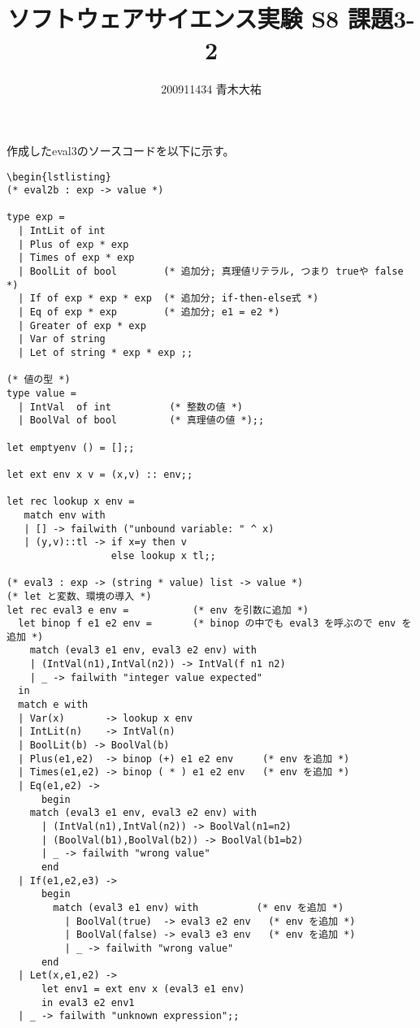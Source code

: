 \documentclass[a4paper,9pt]{jarticle}
\title{ソフトウェアサイエンス実験 S8 課題3-2}
\author{200911434 青木大祐}
\begin{document}
\maketitle
\setcounter{section}{3}
\setcounter{subsection}{1}

\newpage
作成したeval3のソースコードを以下に示す。
\begin{lstlisting}
\begin{lstlisting}
(* eval2b : exp -> value *)

type exp =
  | IntLit of int
  | Plus of exp * exp 
  | Times of exp * exp
  | BoolLit of bool        (* 追加分; 真理値リテラル, つまり trueや false  *)
  | If of exp * exp * exp  (* 追加分; if-then-else式 *)
  | Eq of exp * exp        (* 追加分; e1 = e2 *)
  | Greater of exp * exp 
  | Var of string        
  | Let of string * exp * exp ;;

(* 値の型 *)
type value =
  | IntVal  of int          (* 整数の値 *)
  | BoolVal of bool         (* 真理値の値 *);;
 
let emptyenv () = [];;

let ext env x v = (x,v) :: env;;

let rec lookup x env =
   match env with
   | [] -> failwith ("unbound variable: " ^ x)
   | (y,v)::tl -> if x=y then v 
                  else lookup x tl;;

(* eval3 : exp -> (string * value) list -> value *)
(* let と変数、環境の導入 *)
let rec eval3 e env =           (* env を引数に追加 *)
  let binop f e1 e2 env =       (* binop の中でも eval3 を呼ぶので env を追加 *)
    match (eval3 e1 env, eval3 e2 env) with
    | (IntVal(n1),IntVal(n2)) -> IntVal(f n1 n2)
    | _ -> failwith "integer value expected"
  in 
  match e with
  | Var(x)       -> lookup x env
  | IntLit(n)    -> IntVal(n)
  | BoolLit(b) -> BoolVal(b)
  | Plus(e1,e2)  -> binop (+) e1 e2 env     (* env を追加 *)
  | Times(e1,e2) -> binop ( * ) e1 e2 env   (* env を追加 *)
  | Eq(e1,e2) ->
      begin
	match (eval3 e1 env, eval3 e2 env) with
	  | (IntVal(n1),IntVal(n2)) -> BoolVal(n1=n2)
	  | (BoolVal(b1),BoolVal(b2)) -> BoolVal(b1=b2)
	  | _ -> failwith "wrong value"
      end
  | If(e1,e2,e3) ->
      begin
        match (eval3 e1 env) with          (* env を追加 *)
          | BoolVal(true)  -> eval3 e2 env   (* env を追加 *)
          | BoolVal(false) -> eval3 e3 env   (* env を追加 *)
          | _ -> failwith "wrong value"
      end
  | Let(x,e1,e2) -> 
      let env1 = ext env x (eval3 e1 env)
      in eval3 e2 env1
  | _ -> failwith "unknown expression";;
\end{lstlisting}
\end{document}
